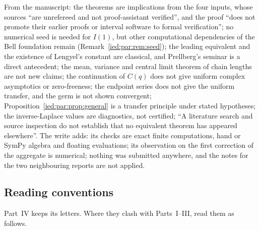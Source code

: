 \documentclass[11pt,letterpaper]{article}
\theoremstyle{remark}\newtheorem{remark}[theorem]{Remark}
\begin{document}
From the manuscript: the theorems are implications from the four inputs, whose
sources ``are unrefereed and not proof-assistant verified'', and the proof
``does not promote their earlier proofs or interval software to formal
verification''; no numerical seed is needed for $I(1)$, but other
computational dependencies of the Bell foundation remain
(Remark~\ref{ied:par:rem:seed}); the leading equivalent and the existence of
Lengyel's constant are classical, and Prellberg's seminar is a direct
antecedent; the mean, variance and central limit theorem of chain lengths are
not new claims; the continuation of $C(q)$ does not give uniform complex
asymptotics or zero-freeness; the endpoint series does not give the uniform
transfer, and the germ is not shown convergent;
Proposition~\ref{ied:par:prop:general} is a transfer principle under stated
hypotheses; the inverse-Laplace values are diagnostics, not certified;
``A literature search and source inspection do not establish that no
equivalent theorem has appeared elsewhere''. The write adds: its checks are
exact finite computations, hand or SymPy algebra and floating evaluations; its
observation on the first correction of the aggregate is numerical; nothing was
submitted anywhere, and the notes for the two neighbouring reports are not
applied.

\subsection{Reading conventions}\label{ied:par:sec:notation}

Part~IV keeps its letters. Where they clash with Parts~I--III, read them as
follows.
\end{document}

